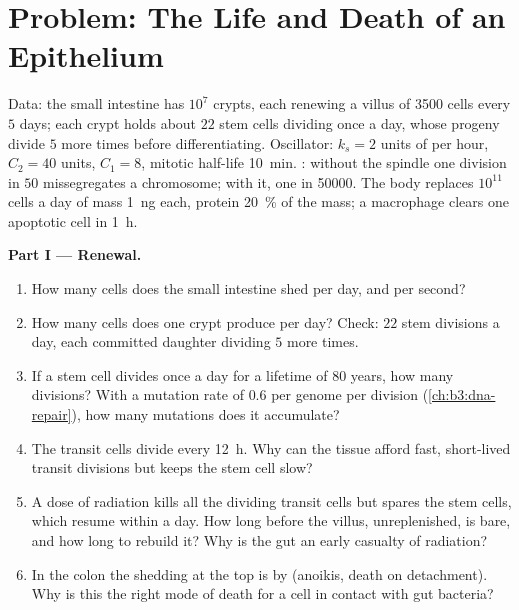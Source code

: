 \section{Problem: The Life and Death of an Epithelium}

\begin{problem}
\label{pb:b3:cell-cycle-apoptosis:1}
Data: the small intestine has $10^{7}$ crypts, each renewing a villus
of \num{3500} cells every $5$ days; each crypt holds about $22$ stem
cells dividing once a day, whose progeny divide $5$ more times before
differentiating. Oscillator: $k_{s} = 2$ units of  per hour,
$C_{2} = 40$ units, $C_{1} = 8$, mitotic  half-life
\qty{10}{min}. : without the spindle  one division
in $50$ missegregates a chromosome; with it, one in \num{50000}. The
body replaces $10^{11}$ cells a day of mass \qty{1}{ng} each, protein
\qty{20}{\%} of the mass; a macrophage clears one apoptotic cell in
\qty{1}{h}.

\medskip
\noindent\textbf{Part I --- Renewal.}
\begin{enumerate}
  \item How many cells does the small intestine shed per day, and per
        second?
  \item How many cells does one crypt produce per day? Check: $22$ stem
        divisions a day, each committed daughter dividing $5$ more
        times.
  \item If a stem cell divides once a day for a lifetime of $80$ years,
        how many divisions? With a mutation rate of $0.6$ per genome per
        division (\cref{ch:b3:dna-repair}), how many mutations does it
        accumulate?
  \item The transit cells divide every \qty{12}{h}. Why can the tissue
        afford fast, short-lived transit divisions but keeps the stem
        cell slow?
  \item A dose of radiation kills all the dividing transit cells but
        spares the stem cells, which resume within a day. How long
        before the villus, unreplenished, is bare, and how long to
        rebuild it? Why is the gut an early casualty of radiation?
  \item In the colon the shedding at the top is by  (anoikis,
        death on detachment). Why is this the right mode of death for a
        cell in contact with gut bacteria?
\end{enumerate}


\end{problem}
